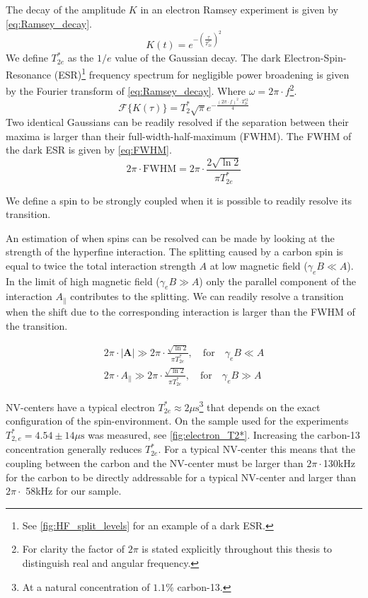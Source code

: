 The decay of the amplitude $K$ in an electron Ramsey experiment is given by \cref{eq:Ramsey_decay}.
\begin{equation}
    K(t) = e^{-(\tfrac{\tau}{T_{2e}^*})^2}
    \label{eq:Ramsey_decay}
\end{equation}
We define $T_{2e}^*$ as the $1/e$ value of the Gaussian decay. The dark Electron-Spin-Resonance (ESR)\footnote{See \cref{fig:HF_split_levels} for an example of a dark ESR.} frequency spectrum for negligible power broadening is given by the Fourier transform of \cref{eq:Ramsey_decay}. Where $\omega = 2\pi \cdot f$\footnote{For clarity the factor of $2\pi$ is stated explicitly throughout this thesis to distinguish real and angular frequency. }.
\begin{equation}
    \mathcal{F} \{ K(\tau) \} =  T_2^* \sqrt{\pi} e^{-\tfrac{(2\pi \cdot f) ^2 \cdot T_{2e}^{*2}}{ 4}}
\end{equation}
Two identical Gaussians can be readily resolved if the separation between their maxima is larger than their full-width-half-maximum (FWHM).
The FWHM of the dark ESR is given by \cref{eq:FWHM}.
\begin{equation}
    2\pi \cdot \mathrm{FWHM} = 2\pi \cdot \frac{2\sqrt{\ln{2}}}{\pi T_{2e}^*}
    \label{eq:FWHM}
\end{equation}

We define a spin to be strongly coupled when it is possible to readily resolve its transition.

An estimation of when spins can be resolved can be made by looking at the strength of the hyperfine interaction.
The splitting caused by a carbon spin is equal to twice the total interaction strength $A$ at low magnetic field ($\gamma_e B \ll A$). In the limit of high magnetic field ($\gamma_e B \gg A$) only the parallel component of the interaction $A_\parallel$ contributes to the splitting.
We can readily resolve a transition when the shift due to the corresponding interaction is larger than the FWHM of the transition.

\begin{align}
     2\pi \cdot |\bm{A}|\gg 2\pi \cdot \frac{\sqrt{\ln{2}}}{\pi T_{2e}^*} , \quad \mathrm{for } \quad \gamma_e B \ll A  \\
     2\pi \cdot A_\parallel \gg 2\pi \cdot \frac{\sqrt{\ln{2}}}{\pi T_{2e}^*}, \quad \mathrm{for } \quad \gamma_e B \gg A
     \label{eq:def_strongly_coupled}
 \end{align}

NV-centers have a typical electron $T_{2e}^* \approx 2\mu \mathrm{s}$\footnote{At a natural concentration of $1.1 \%$ carbon-13.} that depends on the exact configuration of the spin-environment.
On the sample used for the experiments $T_{2,e}^* = 4.54 \pm 14 \mu\mathrm{s}$ was measured, see \cref{fig:electron_T2*}.
Increasing the carbon-13 concentration generally reduces $T_{2e}^*$.
For a typical NV-center this means that the coupling between the carbon and the NV-center must be larger than $2\pi\cdot$130kHz for the carbon to be directly addressable for a typical NV-center and larger than $2\pi\cdot$ 58kHz for our sample.


